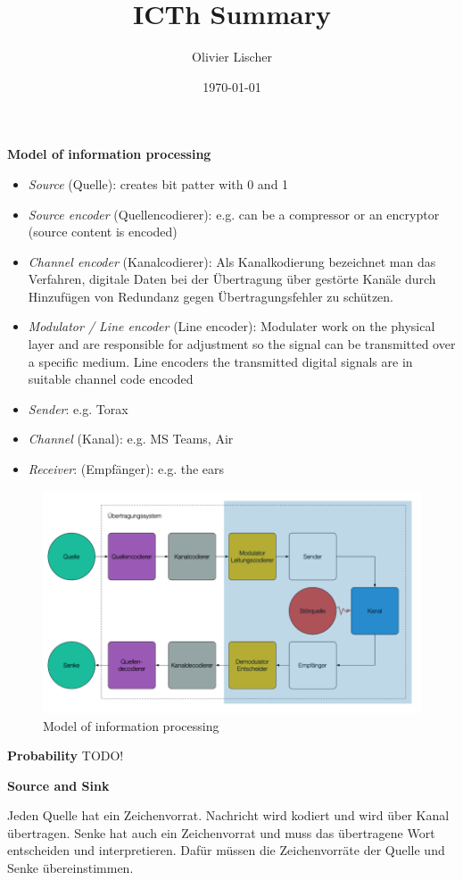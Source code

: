 \documentclass[11pt,twoside,twocolumn,landscape]{article}
\author{Olivier Lischer}
\date{\today}
\title{ICTh Summary}
\begin{document}
\textbf{Model of information processing}

\begin{itemize}
\item \emph{Source} (Quelle): creates bit patter with 0 and 1
\item \emph{Source encoder} (Quellencodierer): e.g. can be a compressor or an encryptor (source content is encoded)
\item \emph{Channel encoder} (Kanalcodierer): 
Als Kanalkodierung bezeichnet man das Verfahren, digitale Daten bei der Übertragung über gestörte Kanäle durch Hinzufügen von Redundanz gegen Übertragungsfehler zu schützen.
\item \emph{Modulator / Line encoder} (Line encoder): Modulater work on the physical layer and are responsible for adjustment so the signal can be transmitted over a specific medium. Line encoders the transmitted digital signals are in suitable channel code encoded
\item \emph{Sender}: e.g. Torax
\item \emph{Channel} (Kanal): e.g. MS Teams, Air
\item \emph{Receiver}: (Empfänger): e.g. the ears
\end{itemize}

\begin{figure}[htbp]
\centering
\includegraphics[width=.9\linewidth]{img/modell_der_informationsverarbeitung.png}
\caption{\label{fig:orgd3d37be}Model of information processing}
\end{figure}

\textbf{Probability}
TODO!

\textbf{Source and Sink}

Jeden Quelle hat ein Zeichenvorrat.
Nachricht wird kodiert und wird über Kanal übertragen.
Senke hat auch ein Zeichenvorrat und muss das übertragene Wort entscheiden und interpretieren.
Dafür müssen die Zeichenvorräte der Quelle und Senke übereinstimmen.
\end{document}
